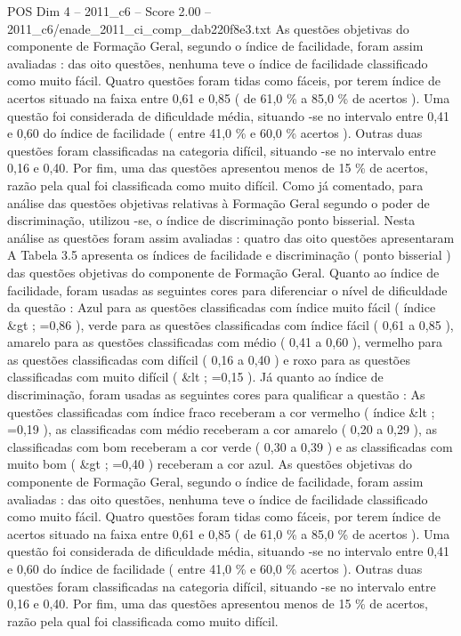 \begin{textsample}{POS Dim 4 – 2011\_c6 – Score 2.00 – 2011\_c6/enade\_2011\_ci\_comp\_dab220f8e3.txt}
As questões objetivas do componente de Formação Geral, segundo o índice de facilidade, foram assim avaliadas : das oito questões, nenhuma teve o índice de facilidade classificado como muito fácil.
Quatro questões foram tidas como fáceis, por terem índice de acertos situado na faixa entre 0,61 e 0,85 ( de 61,0 \% a 85,0 \% de acertos ).
Uma questão foi considerada de dificuldade média, situando -se no intervalo entre 0,41 e 0,60 do índice de facilidade ( entre 41,0 \% e 60,0 \% acertos ).
Outras duas questões foram classificadas na categoria difícil, situando -se no intervalo entre 0,16 e 0,40.
Por fim, uma das questões apresentou menos de 15 \% de acertos, razão pela qual foi classificada como muito difícil.
Como já comentado, para análise das questões objetivas relativas à Formação Geral segundo o poder de discriminação, utilizou -se, o índice de discriminação ponto bisserial.
Nesta análise as questões foram assim avaliadas : quatro das oito questões apresentaram A Tabela 3.5 apresenta os índices de facilidade e discriminação ( ponto bisserial ) das questões objetivas do componente de Formação Geral.
Quanto ao índice de facilidade, foram usadas as seguintes cores para diferenciar o nível de dificuldade da questão : Azul para as questões classificadas com índice muito fácil ( índice \&gt ; =0,86 ), verde para as questões classificadas com índice fácil ( 0,61 a 0,85 ), amarelo para as questões classificadas com médio ( 0,41 a 0,60 ), vermelho para as questões classificadas com difícil ( 0,16 a 0,40 ) e roxo para as questões classificadas com muito difícil ( \&lt ; =0,15 ).
Já quanto ao índice de discriminação, foram usadas as seguintes cores para qualificar a questão : As questões classificadas com índice fraco receberam a cor vermelho ( índice \&lt ; =0,19 ), as classificadas com médio receberam a cor amarelo ( 0,20 a 0,29 ), as classificadas com bom receberam a cor verde ( 0,30 a 0,39 ) e as classificadas com muito bom ( \&gt ; =0,40 ) receberam a cor azul.
As questões objetivas do componente de Formação Geral, segundo o índice de facilidade, foram assim avaliadas : das oito questões, nenhuma teve o índice de facilidade classificado como muito fácil.
Quatro questões foram tidas como fáceis, por terem índice de acertos situado na faixa entre 0,61 e 0,85 ( de 61,0 \% a 85,0 \% de acertos ).
Uma questão foi considerada de dificuldade média, situando -se no intervalo entre 0,41 e 0,60 do índice de facilidade ( entre 41,0 \% e 60,0 \% acertos ).
Outras duas questões foram classificadas na categoria difícil, situando -se no intervalo entre 0,16 e 0,40.
Por fim, uma das questões apresentou menos de 15 \% de acertos, razão pela qual foi classificada como muito difícil.

\end{textsample}
